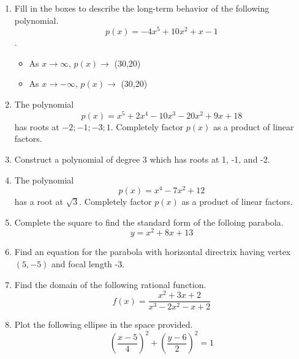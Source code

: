 \documentclass{article}
\begin{document}
\ReviewTitle[class={College Algebra}, for={Test 3}]

\begin{enumerate}
\item Fill in the boxes to describe the long-term behavior of the following polynomial. \[ p(x) = -4x^5 + 10x^2 + x - 1 \].

\begin{itemize}
\item As $x \rightarrow \infty$, $p(x) \rightarrow$ \framebox(30,20){} \vspace{0.5cm}
\item As $x \rightarrow -\infty$, $p(x) \rightarrow$ \framebox(30,20){}
\end{itemize} \vspace{1cm}

\item The polynomial \[ p(x) = x^5 + 2x^4 - 10x^3 - 20x^2 + 9x + 18 \] has roots at ${-2;-1;-3;1}$. Completely factor $p(x)$ as a product of linear factors. \vspace{6cm}

\item Construct a polynomial of degree 3 which has roots at 1, -1, and -2. \vspace{5cm}

\newpage

\item The polynomial \[ p(x) = x^4 - 7x^2 + 12 \] has a root at $\sqrt{3}$. Completely factor $p(x)$ as a product of linear factors. \vspace{9cm}

\item Complete the square to find the standard form of the folloing parabola. \[ y = x^2 + 8x + 13 \] \vspace{6cm}

\item Find an equation for the parabola with horizontal directrix having vertex $(5, -5)$ and focal length -3. \vspace{2cm}

\newpage

\item Find the domain of the following rational function. \[ f(x) = \frac{x^2 + 3x + 2}{x^3 - 2x^2 - x + 2} \] \vspace{5cm}

\item Plot the following ellipse in the space provided. \[ \left(\frac{x - 5}{4}\right)^2 + \left(\frac{y - 6}{2}\right)^2 = 1 \]


\end{enumerate}
\end{document}
